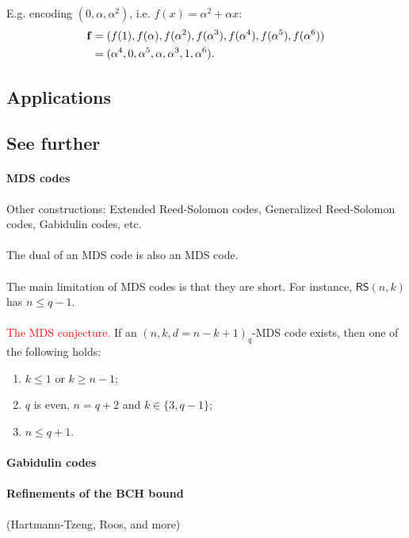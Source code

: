 \documentclass[a4paper, 11pt, openany]{book}
\numberwithin{equation}{section}
\theoremstyle{plain}
\theoremstyle{definition}
\newcommand{\Important}[1]{\textcolor{red}{#1}}
\newcommand{\code}[1]{\mathsf{#1}}
\newcommand{\ReedSolomon}           {\code{RS}}
\begin{document}
E.g. encoding $(0, \alpha, \alpha^2)$, i.e. $f(x) = \alpha^2 + \alpha x$:
\begin{align*}
	{\bf f} &= (f(1), f(\alpha), f(\alpha^2), f(\alpha^3), f(\alpha^4), f(\alpha^5), f(\alpha^6))\\
	&= (\alpha^4, 0, \alpha^5, \alpha, \alpha^3, 1, \alpha^6).
\end{align*}


\subsection{Applications}



\subsection{See further}


\paragraph{MDS codes}
Other constructions: Extended Reed-Solomon codes, Generalized Reed-Solomon codes, Gabidulin codes, etc.\\
~\\
The dual of an MDS code is also an MDS code.\\
~\\
The main limitation of MDS codes is that they are short. For instance, $\ReedSolomon(n,k)$ has $n \le q-1$.\\
~\\
\Important{The MDS conjecture.} If an $(n,k,d = n - k + 1)_q$-MDS code exists, then one of the following holds:
\begin{enumerate}
	\item $k \le 1$ or $k \ge n-1$;
	
	\item $q$ is even, $n = q+2$ and $k \in \{3, q-1\}$;
	
	\item $n \le q+1$.
\end{enumerate}

\paragraph{Gabidulin codes}


\paragraph{Refinements of the BCH bound}
(Hartmann-Tzeng, Roos, and more)
\end{document}
